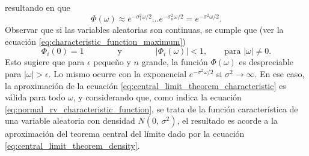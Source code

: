 \documentclass[a4paper]{report}
\begin{document}
resultando en que 
\begin{equation}\label{eq:central_limit_theorem_characteristic}
 \Phi(\omega)\approx e^{-\sigma_1^2\omega/2}\dots e^{-\sigma_n^2\omega/2}=e^{-\sigma^2\omega/2}.
\end{equation}
Observar que si las variables aleatorias son continuas, se cumple que (ver la ecuación \ref{eq:characteristic_function_maximum})
\[
 \Phi_i(0)=1\qquad\qquad\textrm{y}\qquad\qquad|\Phi_i(\omega)|<1,\qquad\textrm{para }|\omega|\neq0.
\]
Esto sugiere que para \(\epsilon\) pequeño y \(n\) grande, la función \(\Phi(\omega)\) es despreciable para \(|\omega|>\epsilon\). Lo mismo ocurre con la exponencial \(e^{-\sigma^2\omega/2}\) si \(\sigma^2\to\infty\). En ese caso, la aproximación de la ecuación \ref{eq:central_limit_theorem_characteristic} es válida para todo \(\omega\), y considerando que, como indica la ecuación \ref{eq:normal_rv_characteristic_function}, se trata de la función característica de una variable aleatoria con densidad \(N(0,\,\sigma^2)\), el resultado es acorde a la aproximación del teorema central del límite dado por la ecuación \ref{eq:central_limit_theorem_density}.
\end{document}
